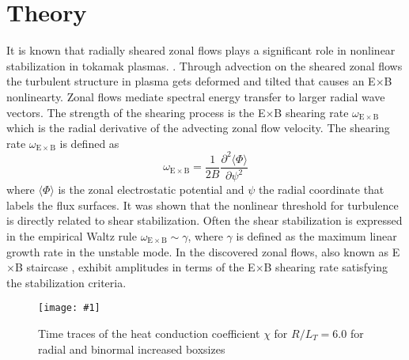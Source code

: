 \documentclass[aip, amsmath, amssymb, reprint, twocolumn]{revtex4-1}
\newcommand{\includegraphicsOneCol}[3]{
	\begin{figure}[h]
		\texttt{[image: \#1]}
		\caption{#2}
  	\end{figure}
	\label{#3}
  	\increasecounter{fig}{1}
}
\begin{document}

\section{Theory}
\label{sec:theory}

It is known that radially sheared zonal flows plays a significant role in nonlinear stabilization in tokamak plasmas. \cite{WACooper1988,doi:10.1063/1.859529,doi:10.1063/1.873896}. 
Through advection on the sheared zonal flows the turbulent structure in plasma gets deformed and tilted that causes an E$\times$B nonlinearty. \cite{doi:10.1063/1.859529, doi:10.1063/1.871313, doi:10.1063/1.872367}
Zonal flows mediate spectral energy transfer to larger radial wave vectors. \cite{doi:10.1063/1.3033206, doi:10.1063/1.3675855, PhysRevLett.120.175002}
The strength of the shearing process is the E$\times$B shearing rate $\omega_{\mathrm{E \times B}}$ which is the radial derivative of the advecting zonal flow velocity. \cite{doi:10.1063/1.871313, doi:10.1063/1.872847}
The shearing rate $\omega_{\mathrm{E \times B}}$ is defined as 
\begin{equation}
	\omega_{\mathrm{E \times B}} = \frac{1}{2B} \frac{\partial^2 \langle \Phi \rangle}{\partial \psi^2}
	\label{eq:shearingrate}
\end{equation}
where $\langle \Phi \rangle$ is the zonal electrostatic potential and $\psi$ the radial coordinate that labels the flux surfaces. \cite{doi:10.1063/1.4952621, doi:10.1063/1.3005380}
It was shown that the nonlinear threshold for turbulence is directly related to shear stabilization. \cite{doi:10.1063/1.873896} 
Often the shear stabilization is expressed in the empirical Waltz rule $\omega_{\mathrm{E \times B}} \sim \gamma$, \cite{doi:10.1063/1.870934, doi:10.1063/1.872847} where $\gamma$ is defined as the maximum linear growth rate in the unstable mode. In the discovered zonal flows, also known as E$\times$B staircase \cite{PhysRevE.82.025401}, exhibit amplitudes in terms of the E$\times$B shearing rate satisfying the stabilization criteria. \cite{doi:10.1063/1.4952621, doi:10.1063/1.4961231}



\includegraphicsOneCol{Comparison/Boxsize/S6_rlt6.0_boxsize1x1-2x2-3x3_Ns16_Nvpar48_Nmu9_eflux_comparison.pdf}{
	Time traces of the heat conduction coefficient $\chi$ for $R/L_T = 6.0$ for radial and binormal increased boxsizes
}{fig:eflux-1x1-2x2-3x3-comparison}
\end{document}
